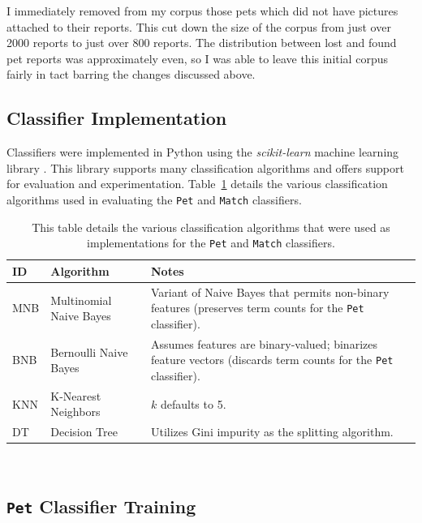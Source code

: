 I immediately removed from my corpus those pets which did not have pictures attached to their reports.  This cut down the size of the corpus from just over 2000 reports to just over 800 reports.  The distribution between lost and found pet reports was approximately even, so I was able to leave this initial corpus fairly in tact barring the changes discussed above.

\subsection {Classifier Implementation}

Classifiers were implemented in Python using the {\em scikit-learn} machine learning library \cite{scikit-learn}.  This library supports many classification algorithms and offers support for evaluation and experimentation.  Table~\ref{table:algorithms} details the various classification algorithms used in evaluating the {\tt Pet} and {\tt Match} classifiers.

\begin{table}[htb]
    \caption[Classifier implementations]{
	This table details the various classification algorithms that were used as implementations for the {\tt Pet} and {\tt Match} classifiers.
	}
    \begin{center}
    \begin{tabularx}{ \textwidth}{| l | l | X | } 
    \hline
    	ID & Algorithm & Notes \\  \hline \hline
			MNB & Multinomial Naive Bayes & Variant of Naive Bayes that permits non-binary features (preserves term counts for the {\tt Pet} classifier). \\ \hline
			BNB & Bernoulli Naive Bayes & Assumes features are binary-valued; binarizes feature vectors (discards term counts for the {\tt Pet} classifier). \\ \hline
			KNN & K-Nearest Neighbors & $k$ defaults to 5. \\ \hline
			DT & Decision Tree & Utilizes Gini impurity as the splitting algorithm. \\ \hline
	\end{tabularx}
   \\ \rule{0mm}{5mm}
	\end{center}
	 \label{table:algorithms}
\end{table}

\subsection {{\tt Pet} Classifier Training}

